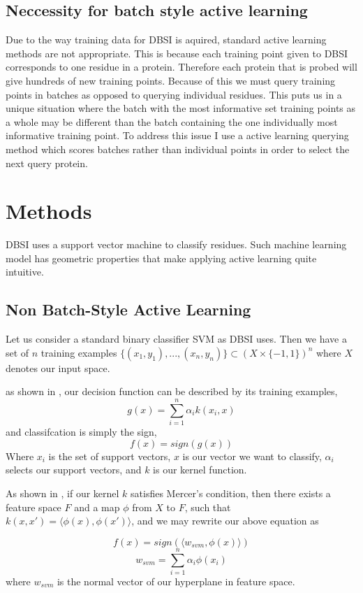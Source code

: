 \documentclass{article}
\begin{document}
\subsection*{Neccessity for batch style active learning}
Due to the way training data for DBSI is aquired, standard active learning methods are not appropriate. This is because each training point given to DBSI corresponds to one residue in a protein. Therefore each protein that is probed will give hundreds of new training points. Because of this we must query training points in batches as opposed to querying individual residues. This puts us in a unique situation where the batch with the most informative set training points as a whole may be different than the batch containing the one individually most informative training point. To address this issue I use a active learning querying method which scores batches rather than individual points in order to select the next query protein.

     
\section*{Methods}
DBSI uses a support vector machine to classify residues. Such machine learning model has geometric properties that make applying active learning quite intuitive. 

\subsection*{Non Batch-Style Active Learning}
Let us consider a standard binary classifier SVM as DBSI uses.
Then we have a set of $n$ training examples
$
\{(x_1,y_1),...,(x_n, y_n)\} \subset (X \times \{-1,1\})^n
$ where $X$ denotes our input space. 


 as shown in \cite{svm}, our decision function can be described by its training examples,
\[
g(x) = \sum_{i=1}^{n} \alpha_i k( x_i, x)
\]
and classifcation is simply the sign,
\[
	f(x) = sign(g(x))
\]
Where $x_i$ is the set of support vectors,
$x$ is our vector we want to classify, $\alpha_i$ selects our support vectors, and $k$ is our kernel function.

As shown in \cite{active_learning}, if our kernel $k$ satisfies Mercer's condition, then there exists a feature space $F$ and a map $\phi$ from $X$ to $F$, such that $k(x,x') = \langle \phi(x) , \phi(x') \rangle$, and we may rewrite our above equation as
 
\[
f(x) = sign(\langle w_{svm}, \phi(x) \rangle)
\]
\[
w_{svm} = \sum_{i=1}^n \alpha_i \phi(x_i)
\]
where $w_{svm}$ is the normal vector of our hyperplane in feature space. 
\end{document}
